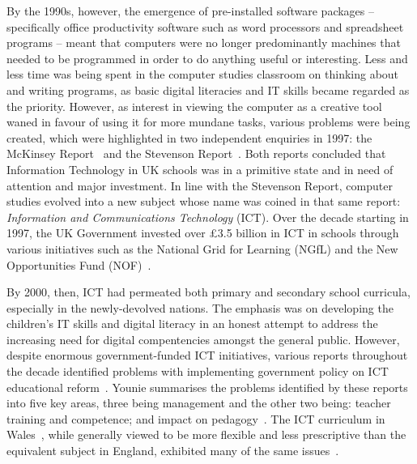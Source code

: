 \documentclass{sig-alternate}
\begin{document}
By the 1990s, however, the emergence of pre-installed software
packages -- specifically office productivity software such as word
processors and spreadsheet programs -- meant that computers were no
longer predominantly machines that needed to be programmed in order to
do anything useful or interesting.  Less and less time was being spent
in the computer studies classroom on thinking about and writing
programs, as basic digital literacies and IT skills became regarded as
the priority. However, as interest in viewing the computer as a
creative tool waned in favour of using it for more mundane tasks,
various problems were being created, which were highlighted in two
independent enquiries in 1997: the McKinsey
Report~\cite{McKinsey:1997} and the Stevenson
Report~\cite{Stevenson:1997}.  Both reports concluded that Information
Technology in UK schools was in a primitive state and in need of
attention and major investment. In line with the Stevenson Report,
computer studies evolved into a new subject whose name was coined in
that same report: {\emph{Information and Communications Technology}}
(ICT).  Over the decade starting in 1997, the UK Government invested
over \pounds3.5 billion in ICT in schools through various initiatives
such as the National Grid for Learning (NGfL) and the New
Opportunities Fund (NOF)~\cite{Doughty:2006}.

By 2000, then, ICT had permeated both primary and secondary school
curricula, especially in the newly-devolved nations. The emphasis was
on developing the children's IT skills and digital literacy in an
honest attempt to address the increasing need for digital
compentencies amongst the general public.  However, despite enormous
government-funded ICT initiatives, various reports throughout the
decade identified problems with implementing government policy on ICT
educational
reform~\cite{OpieFukuyo:2000,Ofsted:2001,Ofsted:2002,Ofsted:2004,
Loveless:2005}. Younie summarises the problems identified by these
reports into five key areas, three being management and the other two
being: teacher training and competence; and impact on
pedagogy~\cite{Younie:2006}. The ICT curriculum in
Wales~\cite{welshictcurric:2008}, while generally viewed to be more
flexible and less prescriptive than the equivalent subject in England,
exhibited many of the same issues~\cite{estynict:2014}.
\end{document}
